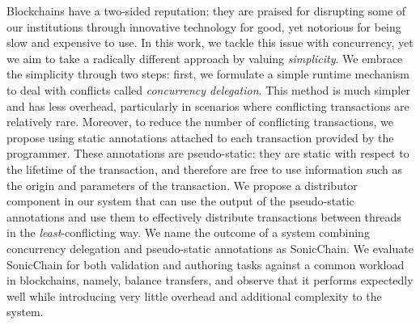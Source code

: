 \begin{abstracts}

Blockchains have a two-sided reputation: they are praised for disrupting some of our institutions
through innovative technology for good, yet notorious for being slow and expensive to use. In this
work, we tackle this issue with concurrency, yet we aim to take a radically different approach by
valuing \textit{simplicity}. We embrace the simplicity through two steps: first, we formulate a
simple runtime mechanism to deal with conflicts called \textit{concurrency delegation}. This method
is much simpler and has less overhead, particularly in scenarios where conflicting transactions are
relatively rare. Moreover, to reduce the number of conflicting transactions, we propose using static
annotations attached to each transaction provided by the programmer. These annotations are
pseudo-static: they are static with respect to the lifetime of the transaction, and therefore are
free to use information such as the origin and parameters of the transaction. We propose a
distributor component in our system that can use the output of the pseudo-static annotations and use
them to effectively distribute transactions between threads in the \textit{least}-conflicting way.
We name the outcome of a system combining concurrency delegation and pseudo-static annotations as
SonicChain. We evaluate SonicChain for both validation and authoring tasks against a common workload
in blockchains, namely, balance transfers, and observe that it performs expectedly well while
introducing very little overhead and additional complexity to the system.

\end{abstracts}
